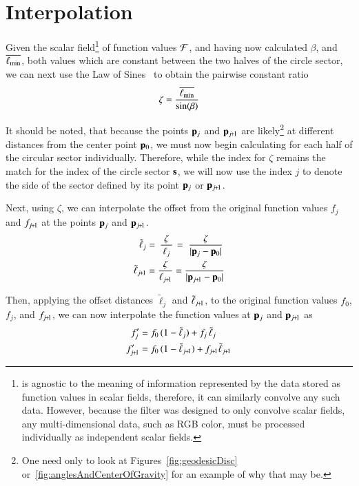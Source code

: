 \section{Interpolation}
\label{ch4sI}
Given the scalar field\footnote{ is agnostic to the meaning of information represented by the data stored as function values in scalar fields, therefore, it can similarly convolve any such data. However, because the filter was designed to only convolve scalar fields, any multi-dimensional data, such as RGB color, must be processed individually as independent scalar fields.} of function values $\mathcal{F}$, and having now calculated $\beta$, and $\overline{\ell_\text{min}}$, both values which are constant between the two halves of the circle sector, we can next use the Law of Sines~\cite{Weisstein19g} to obtain the pairwise constant ratio
%
\begin{equation}
	\zeta = \frac{\overline{\ell_\text{min}}}{\sin(\beta)}
	\label{eq:zeta}
\end{equation}%
%

It should be noted, that because the points $\mathbf{p}_j$ and $\bp_{\sjpo}$ are likely\footnote{One need only to look at Figures~\ref{fig:geodesicDisc} or~\ref{fig:anglesAndCenterOfGravity} for an example of why that may be.} at different distances from the center point $\mathbf{p}_0$, we must now begin calculating for each half of the circular sector individually. Therefore, while the index for $\zeta$ remains the match for the index of the circle sector $\mathbf{s}$, we will now use the index $j$ to denote the side of the sector defined by its point $\mathbf{p}_j$ or $\bp_{\sjpo}$.

Next, using $\zeta$, we can interpolate the offset from the original function values $f_j$ and $f_{\sjpo}$ at the points $\mathbf{p}_j$ and $\bp_{\sjpo}$.
\begin{align}
	\tilde{\ell}_j & = \kern2pt\frac{\zeta}{\kern2pt\ell_j\kern2pt}\kern1pt = \kern3pt\frac{\zeta}{|\bp_j - \bp_0|}
	\label{eq:distanceIForInterpolation}\\
	\tilde{\ell}_{\sjpo} & = \frac{\zeta}{\ell_{\sjpo}} = \frac{\zeta}{|\bp_{\sjpo} - \bp_0|}
	\label{eq:distanceIp1ForInterpolation}
\end{align}%
%

Then, applying the offset distances $\tilde{\ell}_j$ and $\tilde{\ell}_{\sjpo}$, to the original function values $f_0$, $f_j$, and $f_{\sjpo}$, we can now interpolate the function values at $\mathbf{p}_j$ and $\bp_{\sjpo}$ as
\begin{align}
	f'_j & = f_0\,(1 - \tilde{\ell}_j) + f_j\,\tilde{\ell}_j
	\label{eq:interpolatedFi} \\
	f'_{\sjpo} & = f_0\,(1 - \tilde{\ell}_{\sjpo}) + f_{\sjpo}\tilde{\ell}_{\sjpo}
	\label{eq:interpolatedFip1}
\end{align}%
%

